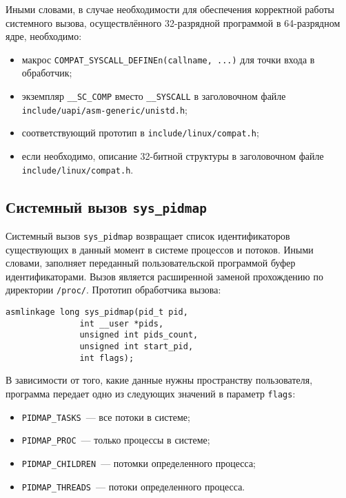 Иными словами, в случае необходимости для обеспечения корректной работы
системного вызова, осуществлённого 32-разрядной программой в 64-разрядном ядре,
необходимо:

\begin{itemize}
\item макрос \texttt{COMPAT\_SYSCALL\_DEFINEn(callname, ...)} для точки входа в
  обработчик;
\item экземпляр \texttt{\_\_SC\_COMP} вместо \texttt{\_\_SYSCALL} в заголовочном
  файле \texttt{include/uapi/asm-generic/unistd.h};
\item соответствующий прототип в \texttt{include/linux/compat.h};
\item если необходимо, описание 32-битной структуры в заголовочном файле
  \texttt{include/linux/compat.h}.
\end{itemize}

\subsection{Системный вызов \texttt{sys\_pidmap}}

Системный вызов \texttt{sys\_pidmap} возвращает список идентификаторов
существующих в данный момент в системе процессов и потоков. Иными словами,
заполняет переданный пользовательской программой буфер идентификаторами. Вызов
является расширенной заменой прохождению по директории \texttt{/proc/}. Прототип
обработчика вызова:

\medskip
\begin{lstlisting}[style=cstyle]
asmlinkage long sys_pidmap(pid_t pid,
			   int __user *pids,
			   unsigned int pids_count,
			   unsigned int start_pid,
			   int flags);
\end{lstlisting}
\medskip

В зависимости от того, какие данные нужны пространству пользователя, программа
передает одно из следующих значений в параметр \texttt{flags}:

\begin{itemize}
\item \texttt{PIDMAP\_TASKS}~--- все потоки в системе;
\item \texttt{PIDMAP\_PROC}~--- только процессы в системе;
\item \texttt{PIDMAP\_CHILDREN}~--- потомки определенного процесса;
\item \texttt{PIDMAP\_THREADS}~--- потоки определенного процесса.
\end{itemize}

